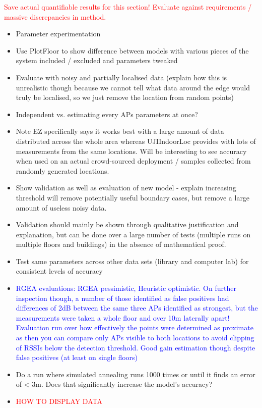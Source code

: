\documentclass{UoYCSproject}
\begin{document}
		\textcolor{red}{Save actual quantifiable results for this section! Evaluate against requirements / massive discrepancies in method.}
		\begin{itemize}
			\item Parameter experimentation
			\item Use PlotFloor to show difference between models with various pieces of the system included / excluded and parameters tweaked
			\item Evaluate with noisy and partially localised data (explain how this is unrealistic though because we cannot tell what data around the edge would truly be localised, so we just remove the location from random points)
            \item Independent vs. estimating every APs parameters at once?
			\item Note EZ specifically says it works best with a large amount of data distributed across the whole area whereas UJIIndoorLoc provides with lots of measurements from the same locations. Will be interesting to see accuracy when used on an actual crowd-sourced deployment / samples collected from randomly generated locations.
			\item Show validation as well as evaluation of new model - explain increasing threshold will remove potentially useful boundary cases, but remove a large amount of useless noisy data.
			\item Validation should mainly be shown through qualitative justification and explanation, but can be done over a large number of tests (multiple runs on multiple floors and buildings) in the absence of mathematical proof.
			\item Test same parameters across other data sets (library and computer lab) for consistent levels of accuracy
            \item \textcolor{blue}{RGEA evaluations: RGEA pessimistic, Heuristic optimistic. On further inspection though, a number of those identified as false positives had differences of 2dB between the same three APs identified as strongest, but the measurements were taken a whole floor and over 10m laterally apart! Evaluation run over how effectively the points were determined as proximate as then you can compare only APs visible to both locations to avoid clipping of RSSIs below the detection threshold. Good gain estimation though despite false positives (at least on single floors)}
            \item Do a run where simulated annealing runs 1000 times or until it finds an error of < 3m. Does that significantly increase the model's accuracy?
            \item \textcolor{red}{HOW TO DISPLAY DATA}
		\end{itemize}
		
\end{document}
